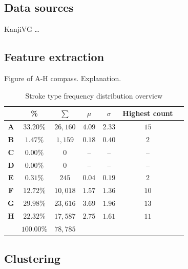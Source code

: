 \documentclass[10pt,conference,a4paper]{IEEEtran}
\begin{document}
	\subsection{Data sources}

	KanjiVG \ldots


	\subsection{Feature extraction}

	Figure of A-H compass. Explanation.

	\begin{table}
		\renewcommand{\arraystretch}{1.3}
		\caption{Stroke type frequency distribution overview }
		\label{tbl_stroke_analysis}
		\centering
		\begin{tabular}{ c | c c c c c l }
			\hline
			  & \bfseries \% & \small $\sum$ & $\mu$ & $\sigma$ & Highest count \\ 
			\hline
			\hline
			\bfseries A & $33.20\%$ & $26,160$ & $4.09$ & $2.33$ & $15$ & \\%
			\bfseries B & $1.47\%$  & $1,159$  & $0.18$ & $0.40$ & $2$  & \\%
			\bfseries C & $0.00\%$  & $0$      & --     & --     & --   & \\%
			\bfseries D & $0.00\%$  & $0$      & --     & --     & --   & \\%
			\bfseries E & $0.31\%$  & $245$    & $0.04$ & $0.19$ & $2$  & \\%
			\bfseries F & $12.72\%$ & $10,018$ & $1.57$ & $1.36$ & $10$ & \\%
			\bfseries G & $29.98\%$ & $23,616$ & $3.69$ & $1.96$ & $13$ & \\%
			\bfseries H & $22.32\%$ & $17,587$ & $2.75$ & $1.61$ & $11$ & \\%
			\hline
			            & $100.00\%$   & $78,785$ &        &        &      & \\
			\hline
		\end{tabular}
	\end{table}



	\subsection{Clustering}
\end{document}
